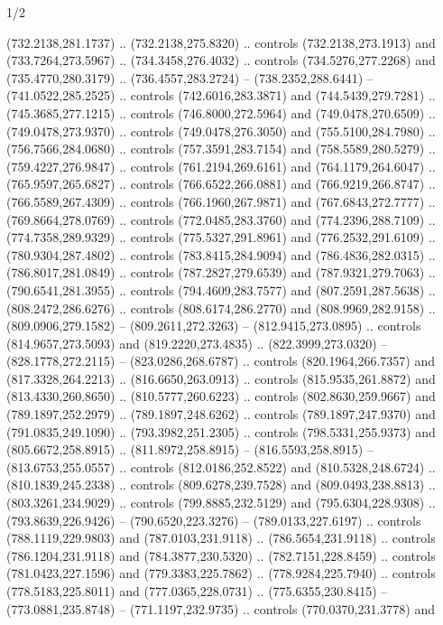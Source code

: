 \begin{flagdescription}{1/2}
\begin{scope}[shift={(2*\flaglength/3-0.25*\rb,0.51333\flagwidth)},scale=0.001715\flagwidth*\stretchfactor]
\begin{scope}[y=-1pt, x=1pt,cm={{1.04354,0.0,0.0,1.01818,(-827,-297)}}]
\begin{scope}[fill=gold]
  (732.2138,281.1737) .. (732.2138,275.8320) .. controls (732.2138,273.1913) and
  (733.7264,273.5967) .. (734.3458,276.4032) .. controls (734.5276,277.2268) and
  (735.4770,280.3179) .. (736.4557,283.2724) -- (738.2352,288.6441) --
  (741.0522,285.2525) .. controls (742.6016,283.3871) and (744.5439,279.7281) ..
  (745.3685,277.1215) .. controls (746.8000,272.5964) and (749.0478,270.6509) ..
  (749.0478,273.9370) .. controls (749.0478,276.3050) and (755.5100,284.7980) ..
  (756.7566,284.0680) .. controls (757.3591,283.7154) and (758.5589,280.5279) ..
  (759.4227,276.9847) .. controls (761.2194,269.6161) and (764.1179,264.6047) ..
  (765.9597,265.6827) .. controls (766.6522,266.0881) and (766.9219,266.8747) ..
  (766.5589,267.4309) .. controls (766.1960,267.9871) and (767.6843,272.7777) ..
  (769.8664,278.0769) .. controls (772.0485,283.3760) and (774.2396,288.7109) ..
  (774.7358,289.9329) .. controls (775.5327,291.8961) and (776.2532,291.6109) ..
  (780.9304,287.4802) .. controls (783.8415,284.9094) and (786.4836,282.0315) ..
  (786.8017,281.0849) .. controls (787.2827,279.6539) and (787.9321,279.7063) ..
  (790.6541,281.3955) .. controls (794.4609,283.7577) and (807.2591,287.5638) ..
  (808.2472,286.6276) .. controls (808.6174,286.2770) and (808.9969,282.9158) ..
  (809.0906,279.1582) -- (809.2611,272.3263) -- (812.9415,273.0895) .. controls
  (814.9657,273.5093) and (819.2220,273.4835) .. (822.3999,273.0320) --
  (828.1778,272.2115) -- (823.0286,268.6787) .. controls (820.1964,266.7357) and
  (817.3328,264.2213) .. (816.6650,263.0913) .. controls (815.9535,261.8872) and
  (813.4330,260.8650) .. (810.5777,260.6223) .. controls (802.8630,259.9667) and
  (789.1897,252.2979) .. (789.1897,248.6262) .. controls (789.1897,247.9370) and
  (791.0835,249.1090) .. (793.3982,251.2305) .. controls (798.5331,255.9373) and
  (805.6672,258.8915) .. (811.8972,258.8915) -- (816.5593,258.8915) --
  (813.6753,255.0557) .. controls (812.0186,252.8522) and (810.5328,248.6724) ..
  (810.1839,245.2338) .. controls (809.6278,239.7528) and (809.0493,238.8813) ..
  (803.3261,234.9029) .. controls (799.8885,232.5129) and (795.6304,228.9308) ..
  (793.8639,226.9426) -- (790.6520,223.3276) -- (789.0133,227.6197) .. controls
  (788.1119,229.9803) and (787.0103,231.9118) .. (786.5654,231.9118) .. controls
  (786.1204,231.9118) and (784.3877,230.5320) .. (782.7151,228.8459) .. controls
  (781.0423,227.1596) and (779.3383,225.7862) .. (778.9284,225.7940) .. controls
  (778.5183,225.8011) and (777.0365,228.0731) .. (775.6355,230.8415) --
  (773.0881,235.8748) -- (771.1197,232.9735) .. controls (770.0370,231.3778) and

\end{scope}
\end{scope}
\end{scope}
\end{flagdescription}
